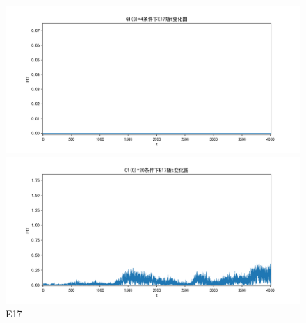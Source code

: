 \documentclass[10pt, a4paper]{article}
\begin{document}
    \begin{figure}[H]
        \begin{minipage}[t]{0.49\textwidth}
            \centering
            \includegraphics[width=\textwidth]{./q5_pics/cmp/E17.png}
        \end{minipage}
        \begin{minipage}[t]{0.49\textwidth}
            \centering
            \includegraphics[width=\textwidth]{./q5_pics/exp/E17.png}
        \end{minipage}
        \caption{E17}\label{fig:E17 in q5}
    \end{figure}
\end{document}
